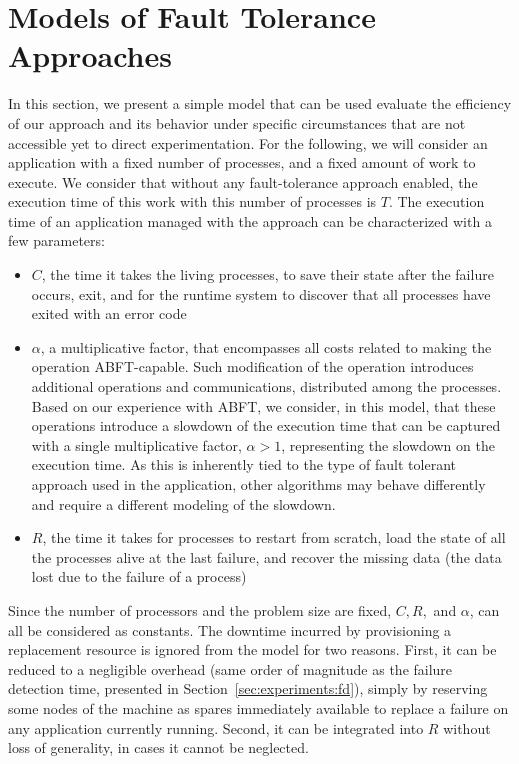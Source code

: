 \section{Models of Fault Tolerance Approaches\label{sec:model}}

In this section, we present a simple model that can be used evaluate the
efficiency of our approach and its behavior under specific circumstances
that are not accessible yet to direct experimentation. For the
following, we will consider an application with a fixed number of
processes, and a fixed amount of work to execute. We consider that
without any fault-tolerance approach enabled, the execution time of this
work with this number of processes is $T$.
%
The execution time of an application managed with the \cof approach 
can be characterized with a few parameters:
\begin{itemize}
\item $C$, the time it takes the living processes, to save their state after the
  failure occurs, exit, and for the runtime system to discover that all
  processes have exited with an error code
\item $\alpha$, a multiplicative factor, that encompasses all costs related to
  making the operation ABFT-capable. Such modification of the operation
  introduces additional operations and communications, distributed among the
  processes. Based on our experience with ABFT, we consider, in this model, that
  these operations introduce a slowdown of the execution time that can be
  captured with a single multiplicative factor, $\alpha > 1$, 
  representing the slowdown on the execution time. As this is inherently 
  tied to the type of fault tolerant approach used in the application, 
  other algorithms may behave differently and require a different modeling 
  of the slowdown. 
\item $R$, the time it takes for processes to restart from scratch, load the
  state of all the processes alive at the last failure, and recover the missing
  data (the data lost due to the failure of a process)
\end{itemize}
Since the number of processors and the problem size are fixed, $C, R,$
and $\alpha$, can all be considered as constants. The downtime incurred 
by provisioning a replacement resource is ignored from the model for two
reasons. First, it can be reduced to a negligible overhead (same order 
of magnitude as the failure detection time, presented in 
Section~\ref{sec:experiments:fd}), simply by reserving some nodes of the 
machine as spares immediately available to replace a failure on any 
application currently running. Second, it can be integrated into $R$ 
without loss of generality, in cases it cannot be neglected. 


